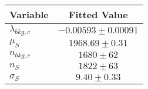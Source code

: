 \begin{tabular}[t]{lc}
\hline
Variable &Fitted Value\\
\hline\hline
$\lambda_{bkg,c}$&$-0.00593\pm0.00091$\\
\hline
$\mu_{S}$&$1968.69\pm0.31$\\
\hline
$n_{bkg,c}$&$1680\pm62$\\
\hline
$n_{S}$&$1822\pm63$\\
\hline
$\sigma_{S}$&$9.40\pm0.33$\\
\hline
\end{tabular}